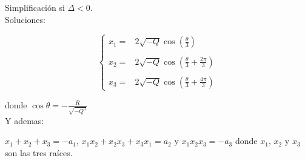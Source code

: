 \clearpage

Simplificación si $\Delta < 0$.\\
Soluciones:

$$\left\{\begin{matrix}
x_1= & 2\sqrt{-Q}\cos \left(  \frac{\theta}{3} \right) \\ \\
x_2= & 2\sqrt{-Q}\cos \left(  \frac{\theta}{3} + \frac{2\pi}{3} \right)\\ \\
x_3= & 2\sqrt{-Q}\cos \left(  \frac{\theta}{3} + \frac{4\pi}{3} \right)
\end{matrix}\right.$$

donde $\displaystyle \cos \theta = -\frac{R}{\sqrt{-Q^3}}$\\
Y ademas:

$x_1 + x_2 + x_3 = -a_1$, $x_1x_2+x_2x_3+x_3x_1 = a_2$ y $x_1x_2x_3 = -a_3$ donde $x_1$, $x_2$ y $x_3$ \\
son las tres raíces.